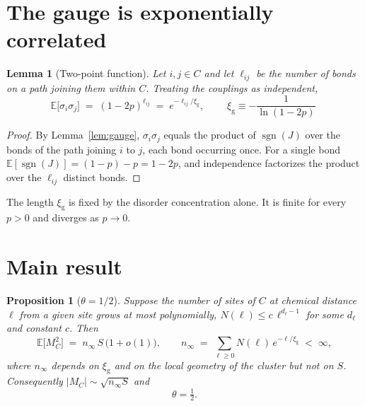 \documentclass[11pt]{article}
\newtheorem{lemma}{Lemma}
\newtheorem{proposition}{Proposition}
\theoremstyle{remark}
\newcommand{\Mc}{M_{C}}
\newcommand{\xig}{\xi_{\mathrm{g}}}
\begin{document}
\section{The gauge is exponentially correlated}

\begin{lemma}[Two-point function]\label{lem:twopoint}
Let $i,j \in C$ and let $\ell_{ij}$ be the number of bonds on a path joining them within
$C$. Treating the couplings as independent,
\begin{equation}
  \mathbb{E}\bigl[\sigma_i \sigma_j\bigr]
  \;=\; (1-2p)^{\ell_{ij}}
  \;=\; e^{-\ell_{ij}/\xig},
  \qquad
  \boxed{\;\xig \equiv -\frac{1}{\ln(1-2p)}\;}
  \label{eq:xi}
\end{equation}
\end{lemma}

\begin{proof}
By Lemma~\ref{lem:gauge}, $\sigma_i\sigma_j$ equals the product of $\operatorname{sgn}(J)$
over the bonds of the path joining $i$ to $j$, each bond occurring once. For a single bond
$\mathbb{E}[\operatorname{sgn}(J)] = (1-p)-p = 1-2p$, and independence factorizes the
product over the $\ell_{ij}$ distinct bonds.
\end{proof}

The length $\xig$ is fixed by the disorder concentration alone. It is finite for every
$p>0$ and diverges as $p \to 0$.

\section{Main result}

\begin{proposition}[$\theta = 1/2$]\label{prop:main}
Suppose the number of sites of $C$ at chemical distance $\ell$ from a given site grows at
most polynomially, $N(\ell) \le c\,\ell^{d_\ell - 1}$ for some $d_\ell$ and constant $c$.
Then
\begin{equation}
  \mathbb{E}\bigl[\Mc^{2}\bigr] \;=\; n_\infty\, S \,\bigl(1 + o(1)\bigr),
  \qquad
  n_\infty \;=\; \sum_{\ell \ge 0} N(\ell)\, e^{-\ell/\xig} \;<\; \infty ,
\end{equation}
where $n_\infty$ depends on $\xig$ and on the local geometry of the cluster but not on
$S$. Consequently $|\Mc| \sim \sqrt{n_\infty S}$ and
\begin{equation}
  \theta = \tfrac{1}{2}.
\end{equation}
\end{proposition}
\end{document}
